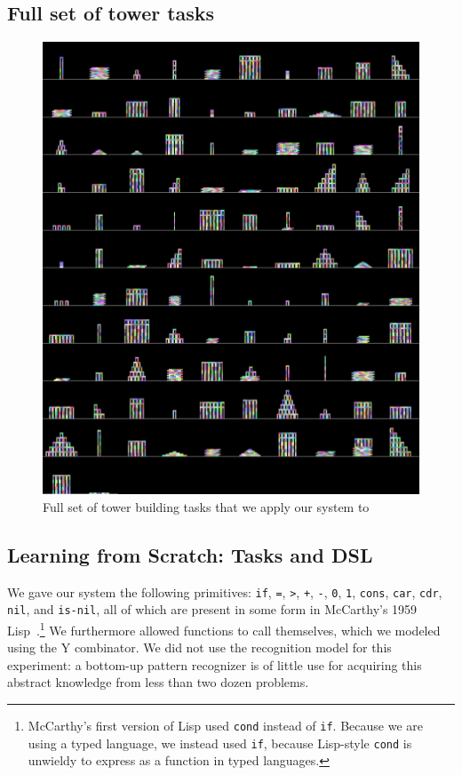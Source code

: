\documentclass{article}
\newcommand{\code}[1]{{\footnotesize\texttt{#1}}}
\begin{document}
\subsection{Full set of tower tasks}
\begin{figure}
  \includegraphics[width = \textwidth]{figures/fullTower.png}
  \caption{Full set of tower building tasks that we apply our system to}
\end{figure}

\subsection{Learning from Scratch: Tasks and DSL}\label{appendixMcCarthy}

We gave our system the following primitives: \code{if}, \code{=},
\code{>}, \code{+}, \code{-}, \code{0}, \code{1}, \code{cons},
\code{car}, \code{cdr}, \code{nil}, and \code{is-nil}, all of which
are present in some form in McCarthy's 1959
Lisp~\cite{mccarthy1960recursive}.\footnote{McCarthy's first version
  of Lisp used \code{cond} instead of \code{if}. Because we are using
  a typed language, we instead used \code{if}, because Lisp-style
  \code{cond} is unwieldy to express as a function in typed
  languages.}  We furthermore allowed functions to call themselves,
which we modeled using the Y combinator.  We did not use the
recognition model for this experiment: a bottom-up pattern recognizer
is of little use for acquiring this abstract knowledge from less than
two dozen problems.
\end{document}
